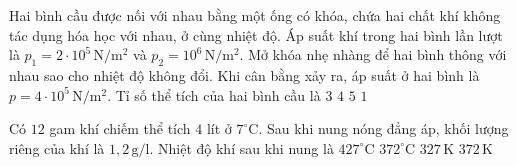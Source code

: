 \begin{ex}
Hai bình cầu được nối với nhau bằng một ống có khóa, chứa hai chất khí không tác dụng hóa học với nhau, ở cùng nhiệt độ. Áp suất khí trong hai bình lần lượt là $p_1=2\cdot 10^5\,\mathrm{N/m^2}$ và $p_2=10^6\,\mathrm{N/m^2}$. Mở khóa nhẹ nhàng để hai bình thông với nhau sao cho nhiệt độ không đổi. Khi cân bằng xảy ra, áp suất ở hai bình là $p=4\cdot 10^5\,\mathrm{N/m^2}$. Tỉ số thể tích của hai bình cầu là
\choice
{\True $3$}
{$4$}
{$5$}
{$1$}
\end{ex}

\begin{ex}
Có $12$ gam khí chiếm thể tích $4$ lít ở $7^\circ\mathrm{C}$. Sau khi nung nóng đẳng áp, khối lượng riêng của khí là $1,2\,\mathrm{g/l}$. Nhiệt độ khí sau khi nung là
\choice
{\True $427^\circ\mathrm{C}$}
{$372^\circ\mathrm{C}$}
{$327\,\mathrm{K}$}
{$372\,\mathrm{K}$}
\end{ex}

